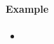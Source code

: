 \documentclass[12pt]{article}
\begin{document}
\paragraph{Example}
\begin{itemize}
    \item
        \begin{minipage}[t]{\linewidth}
              \raggedright
              \medskip


\end{minipage}
\end{itemize}
\end{document}

